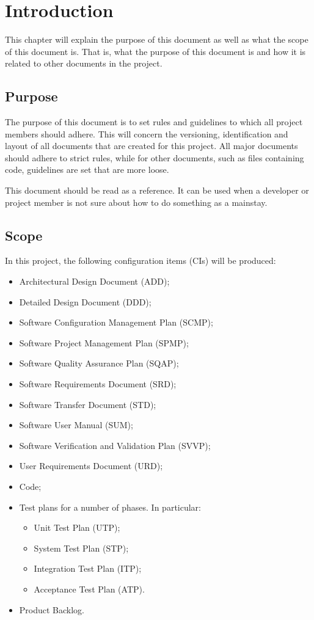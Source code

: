\chapter{Introduction}
\label{chap:introduction}
This chapter will explain the purpose of this document as well as what the scope of this document is. That is, what the purpose of this document is and how it is related to other documents in the project.

\section{Purpose}
The purpose of this document is to set rules and guidelines to which all project members should adhere. This will concern the versioning, identification and layout of all documents that are created for this project. All major documents should adhere to strict rules, while for other documents, such as files containing code, guidelines are set that are more loose.

This document should be read as a reference. It can be used when a developer or project member is not sure about how to do something as a mainstay.

\section{Scope}
In this project, the following configuration items (CIs) will be produced:
\begin{itemize}
	\item Architectural Design Document (ADD);
	\item Detailed Design Document (DDD);
	\item Software Configuration Management Plan (SCMP);
	\item Software Project Management Plan (SPMP);
	\item Software Quality Assurance Plan (SQAP);
	\item Software Requirements Document (SRD);
	\item Software Transfer Document (STD);
	\item Software User Manual (SUM);
	\item Software Verification and Validation Plan (SVVP);
	\item User Requirements Document (URD);
	\item Code;
	\item Test plans for a number of phases. In particular:
	\begin{itemize}
		\item Unit Test Plan (UTP);
		\item System Test Plan (STP);
		\item Integration Test Plan (ITP);
		\item Acceptance Test Plan (ATP).
	\end{itemize}
	\item Product Backlog.
\end{itemize}

